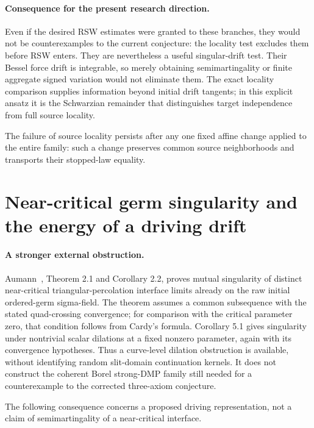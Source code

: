\documentclass[11pt]{article}
\theoremstyle{definition}\newtheorem{definition}[theorem]{Definition}
\theoremstyle{remark}\newtheorem{remark}[theorem]{Remark}
\begin{document}
\paragraph{Consequence for the present research direction.}
Even if the desired RSW estimates were granted to these branches, they
would not be counterexamples to the current conjecture: the locality
test excludes them before RSW enters. They are nevertheless a useful
singular-drift test. Their Bessel force drift is integrable, so merely
obtaining semimartingality or finite aggregate signed variation would
not eliminate them. The exact locality comparison supplies information
beyond initial drift tangents; in this explicit ansatz it is the
Schwarzian remainder that distinguishes target independence from full
source locality.

The failure of source locality persists after any one fixed affine
change applied to the entire family: such a change preserves common
source neighborhoods and transports their stopped-law equality.


\section{Near-critical germ singularity and the energy of a driving drift}
\label{sec:germ-energy}

\paragraph{A stronger external obstruction.}
Aumann~\cite{aumann}, Theorem 2.1 and Corollary 2.2, proves mutual
singularity of distinct near-critical triangular-percolation interface
limits already on the raw initial ordered-germ sigma-field. The theorem
assumes a common subsequence with the stated quad-crossing convergence;
for comparison with the critical parameter zero, that condition follows
from Cardy's formula. Corollary 5.1 gives singularity under nontrivial
scalar dilations at a fixed nonzero parameter, again with its convergence
hypotheses. Thus a curve-level dilation obstruction is available, without
identifying random slit-domain continuation kernels. It does not construct
the coherent Borel strong-DMP family still needed for a counterexample to
the corrected three-axiom conjecture.

The following consequence concerns a proposed driving representation,
not a claim of semimartingality of a near-critical interface.
\end{document}
